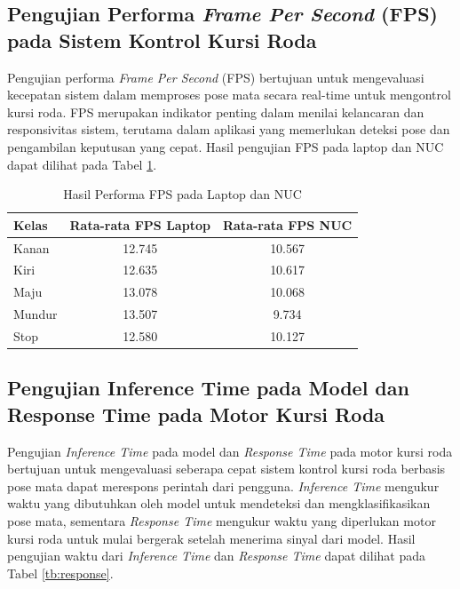 \subsection{Pengujian Performa \emph{Frame Per Second} (FPS) pada Sistem Kontrol Kursi Roda}

Pengujian performa \emph{Frame Per Second} (FPS) bertujuan untuk mengevaluasi kecepatan sistem dalam memproses pose mata secara real-time untuk mengontrol kursi roda. FPS merupakan indikator penting dalam menilai kelancaran dan responsivitas sistem, terutama dalam aplikasi yang memerlukan deteksi pose dan pengambilan keputusan yang cepat. Hasil pengujian FPS pada laptop dan NUC dapat dilihat pada Tabel \ref{tb:fps}.

\begin{table}[H]
  \caption{Hasil Performa FPS pada Laptop dan NUC}
  \label{tb:fps}
  \centering
  \begin{tabular}{|l|c|c|}
  \hline
  \rowcolor[HTML]{C0C0C0} 
  \textbf{Kelas} & \textbf{Rata-rata FPS Laptop} & \textbf{Rata-rata FPS NUC} \\ \hline
  Kanan           & 12.745              & 10.567           \\ \hline
  Kiri           & 12.635              & 10.617            \\ \hline
  Maju           & 13.078              & 10.068           \\ \hline
  Mundur           & 13.507              & 9.734           \\ \hline
  Stop           & 12.580              & 10.127            \\ \hline
  \end{tabular}
\end{table}

\subsection{Pengujian Inference Time pada Model dan Response Time pada Motor Kursi Roda}

Pengujian \emph{Inference Time} pada model dan \emph{Response Time} pada motor kursi roda bertujuan untuk mengevaluasi seberapa cepat sistem kontrol kursi roda berbasis pose mata dapat merespons perintah dari pengguna. \emph{Inference Time} mengukur waktu yang dibutuhkan oleh model untuk mendeteksi dan mengklasifikasikan pose mata, sementara \emph{Response Time} mengukur waktu yang diperlukan motor kursi roda untuk mulai bergerak setelah menerima sinyal dari model. Hasil pengujian waktu dari \emph{Inference Time} dan \emph{Response Time} dapat dilihat pada Tabel \ref{tb:response}.

